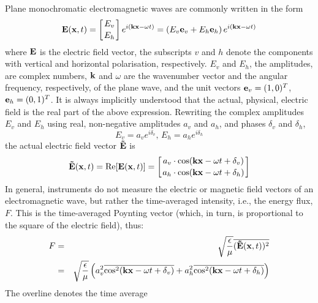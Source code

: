 Plane monochromatic electromagnetic waves are commonly written in the form
\begin{equation} 
  \label{eq:polarization:e_field}
  \mathbf{E}(\mathbf{x},t) 
   = \left[E_v \atop E_h\right] e^{i(\mathbf{k}\mathbf{x} - \omega t)}
   = \left(E_v \mathbf{e}_v +  E_h \mathbf{e}_h \right) 
      e^{i(\mathbf{k}\mathbf{x} - \omega t)}
\end{equation}
where $\mathbf{E}$ is the electric field vector, the subscripts $v$
and $h$ denote the components with vertical and horizontal
polarisation, respectively. $E_v$ and $E_h$, the amplitudes, are
complex numbers, $\mathbf{k}$ and $\omega$ are the wavenumber vector
and the angular frequency, respectively, of the plane wave, and the
unit vectors $\mathbf{e}_v = (1,0)^T$, $\mathbf{e}_h = (0,1)^T$.  It is always
implicitly understood that the actual, physical, electric field is the
real part of the above expression. Rewriting the complex amplitudes
$E_v$ and $E_h$ using real, non-negative amplitudes $a_v$ and $a_h$, and
phases $\delta_v$ and $\delta_h$,
\begin{equation}
  \label{eq:polarization:compl_ampl}
  E_v=a_v e^{i\delta_v}\mbox{, }
  E_h=a_h e^{i\delta_h}
\end{equation}
the actual electric field vector $\mathbf{\tilde{E}}$ is
\begin{equation}
  \label{eq:polarization:actual_efield}
  \mathbf{\tilde{E}}(\mathbf{x},t) = \mathrm{Re}[\mathbf{E}(\mathbf{x},t)] 
    = \left[a_v\cdot \cos(\mathbf{k}\mathbf{x} - \omega t + \delta_v) 
                       \atop 
            a_h\cdot \cos(\mathbf{k}\mathbf{x} - \omega t + \delta_h) 
       \right] 
\end{equation}
In general, instruments do not measure the electric or magnetic field
vectors of an electromagnetic wave, but rather the time-averaged
intensity, i.e., the energy flux, $F$. This is the time-averaged Poynting
vector (which, in turn, is proportional to the square of the electric
field), thus:
\begin{eqnarray}
  F 
  &=& 
  \sqrt{\frac{\epsilon}{\mu}}\overline{(\mathbf{\tilde{E}}(\mathbf{x},t))^2}\\
   \nonumber
  &=&
  \sqrt{\frac{\epsilon}{\mu}}\left(
    a_v^2\overline{\cos^2(\mathbf{k}\mathbf{x} - \omega t + \delta_v)}
    + a_h^2\overline{\cos^2(\mathbf{k}\mathbf{x} - \omega t + \delta_h)}
   \right)
  \label{eq:polarization:intensity}
\end{eqnarray}
The overline denotes the time average
